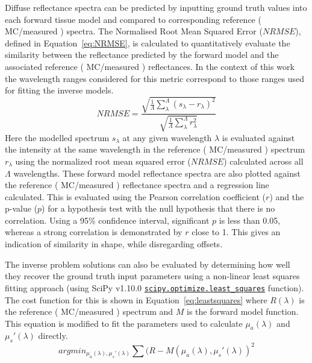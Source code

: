 Diffuse reflectance spectra can be predicted by inputting ground truth values into each forward tissue model and compared to corresponding reference (%
MC/measured%
) spectra. The Normalised Root Mean Squared Error ($NRMSE$), defined in Equation~\eqref{eq:NRMSE}, is calculated to quantitatively evaluate the similarity between the reflectance predicted by the forward model and the associated reference (
MC/measured%
) reflectances. In the context of this work the wavelength ranges considered for this metric correspond to those ranges used for fitting the inverse models.
\begin{equation}
    NRMSE = \frac{\sqrt{\frac{1}{\Lambda}\sum_{\lambda}^{\Lambda}\left(s_{\lambda} - r_{\lambda}\right)^2}}{\sqrt{\frac{1}{\Lambda}\sum_{\lambda}^{\Lambda} r^2_{\lambda}}}
    \label{eq:NRMSE}
\end{equation}
Here the modelled spectrum $s_{\lambda}$ at any given wavelength $\lambda$ is evaluated against the intensity at the same wavelength in the reference (
MC/measured
) spectrum $r_{\lambda}$ using the normalized root mean squared error ($NRMSE$) calculated across all $\Lambda$ wavelengths. These forward model reflectance spectra are also plotted against the reference (
MC/measured
) reflectance spectra and a regression line calculated. This is evaluated using the Pearson correlation coefficient ($r$) and the p-value ($p$) for a hypothesis test with the null hypothesis that there is no correlation. Using a 95\% confidence interval, significant $p$ is less than 0.05, whereas a strong correlation is demonstrated by $r$ close to 1.  This gives an indication of similarity in shape, while disregarding offsets.

The inverse problem solutions can also be evaluated by determining how well they recover the ground truth input parameters using a non-linear least squares fitting approach (using SciPy v1.10.0 \href{https://docs.scipy.org/doc/scipy/reference/generated/scipy.optimize.least_squares.html}{\texttt{scipy.optimize.least\_squares}} function). The cost function for this is shown in Equation~\eqref{eq:leastsquares} where $R(\lambda)$ is the reference (
MC/measured
) spectrum and $M$ is the forward model function. This equation is modified to fit the parameters used to calculate $\mu_a(\lambda)$ and $\mu_s'(\lambda)$ directly.
\begin{equation}
    argmin_{\mu_{a}(\lambda), \mu_{s}'(\lambda)} \sum (R - M(\mu_{a}(\lambda), \mu_s'(\lambda))^2
    \label{eq:leastsquares}
\end{equation}

